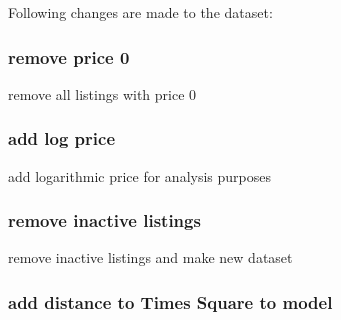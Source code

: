 \documentclass[]{article}
\newenvironment{Shaded}{\begin{snugshade}}{\end{snugshade}}
\newcommand{\DataTypeTok}[1]{\textcolor[rgb]{0.13,0.29,0.53}{#1}}
\newcommand{\DecValTok}[1]{\textcolor[rgb]{0.00,0.00,0.81}{#1}}
\newcommand{\KeywordTok}[1]{\textcolor[rgb]{0.13,0.29,0.53}{\textbf{#1}}}
\newcommand{\NormalTok}[1]{#1}
\newcommand{\OperatorTok}[1]{\textcolor[rgb]{0.81,0.36,0.00}{\textbf{#1}}}
\newcommand{\StringTok}[1]{\textcolor[rgb]{0.31,0.60,0.02}{#1}}
\begin{document}
Following changes are made to the dataset:

\hypertarget{remove-price-0}{%
\subsubsection{remove price 0}\label{remove-price-0}}

remove all listings with price 0

\begin{Shaded}
\end{Shaded}

\hypertarget{add-log-price}{%
\subsubsection{add log price}\label{add-log-price}}

add logarithmic price for analysis purposes

\begin{Shaded}
\end{Shaded}

\hypertarget{remove-inactive-listings}{%
\subsubsection{remove inactive
listings}\label{remove-inactive-listings}}

remove inactive listings and make new dataset

\begin{Shaded}
\end{Shaded}

\hypertarget{add-distance-to-times-square-to-model}{%
\subsubsection{add distance to Times Square to
model}\label{add-distance-to-times-square-to-model}}
\end{document}
